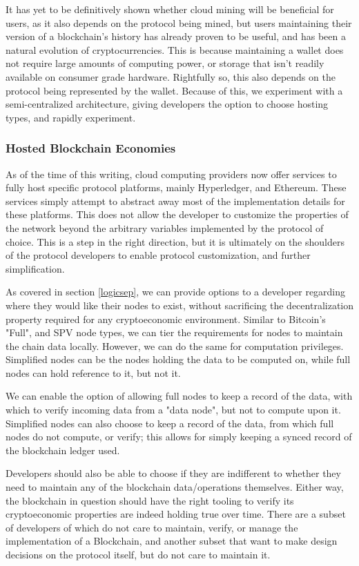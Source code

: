 \documentclass[12pt, titlepage, twocolumn]{report}
\begin{document}
It has yet to be definitively shown whether cloud mining will be beneficial for users, as it also depends on the protocol being mined, but users maintaining their version of a blockchain's history has already proven to be useful, and has been a natural evolution of cryptocurrencies. This is because maintaining a wallet does not require large amounts of computing power, or storage that isn't readily available on consumer grade hardware. Rightfully so, this also depends on the protocol being represented by the wallet. Because of this, we experiment with a semi-centralized architecture, giving developers the option to choose hosting types, and rapidly experiment.


\subsubsection{Hosted Blockchain Economies}
As of the time of this writing, cloud computing providers now offer services to fully host specific protocol platforms, mainly Hyperledger, and Ethereum. These services simply attempt to abstract away most of the implementation details for these platforms. This does not allow the developer to customize the properties of the network beyond the arbitrary variables implemented by the protocol of choice. This is a step in the right direction, but it is ultimately on the shoulders of the protocol developers to enable protocol customization, and further simplification.

As covered in section \ref{logicsep}, we can provide options to a developer regarding where they would like their nodes to exist, without sacrificing the decentralization property required for any cryptoeconomic environment. Similar to Bitcoin's "Full", and SPV node types, we can tier the requirements for nodes to maintain the chain data locally. However, we can do the same for computation privileges. Simplified nodes can be the nodes holding the data to be computed on, while full nodes can hold reference to it, but not it. 

We can enable the option of allowing full nodes to keep a record of the data, with which to verify incoming data from a "data node", but not to compute upon it. Simplified nodes can also choose to keep a record of the data, from which full nodes do not compute, or verify; this allows for simply keeping a synced record of the blockchain ledger used. 

Developers should also be able to choose if they are indifferent to whether they need to maintain any of the blockchain data/operations themselves. Either way, the blockchain in question should have the right tooling to verify its cryptoeconomic properties are indeed holding true over time. There are a subset of developers of which do not care to maintain, verify, or manage the implementation of a Blockchain, and another subset that want to make design decisions on the protocol itself, but do not care to maintain it. 
\end{document}
